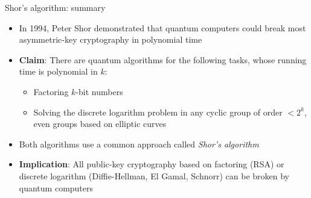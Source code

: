 \documentclass[aspectratio=169, lualatex, handout]{beamer}
\begin{document}
\begin{frame}{Shor's algorithm: summary}
	\begin{itemize}
		\item In 1994, Peter Shor demonstrated that quantum computers could break most asymmetric-key cryptography in polynomial time
		\item \textbf{Claim}: There are quantum algorithms for the following tasks, whose running time is polynomial in $k$:
		      \begin{itemize}
			      \item Factoring $k$-bit numbers
			      \item Solving the discrete logarithm problem in any cyclic group of order $< 2^k$, even groups based on elliptic curves
		      \end{itemize}
		\item Both algorithms use a common approach called \textit{Shor's algorithm}
		\item \textbf{Implication}: All public-key cryptography based on factoring (RSA) or discrete logarithm (Diffie-Hellman, El Gamal, Schnorr) can be broken by quantum computers
	\end{itemize}
\end{frame}
\end{document}
